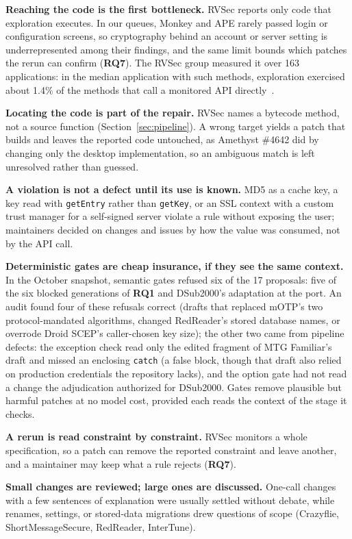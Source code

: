 \documentclass[conference]{IEEEtran}
\newcommand{\researchq}[1]{\textbf{RQ#1}}
\begin{document}
\textbf{Reaching the code is the first bottleneck.} RVSec reports only code
that exploration executes. In our queues, Monkey and APE rarely passed login or
configuration screens, so cryptography behind an account or server setting is
underrepresented among their findings, and the same limit bounds which patches
the rerun can confirm (\researchq{7}). The RVSec group measured it over 163
applications: in the median application with such methods, exploration
exercised about 1.4\% of the methods that call a monitored API
directly~\cite{costa2026effectiveness}.

\textbf{Locating the code is part of the repair.} RVSec names a bytecode
method, not a source function (Section~\ref{sec:pipeline}). A wrong target
yields a patch that builds and leaves the reported code untouched, as Amethyst
\#4642 did by changing only the desktop implementation, so an ambiguous match
is left unresolved rather than guessed.

\textbf{A violation is not a defect until its use is known.} MD5 as a cache
key, a key read with \texttt{getEntry} rather than \texttt{getKey}, or an SSL
context with a custom trust manager for a self-signed server violate a rule
without exposing the user; maintainers decided on changes and issues by how the value was
consumed, not by the API call.

\textbf{Deterministic gates are cheap insurance, if they see the same context.}
In the October snapshot, semantic gates refused six of the 17 proposals: five
of the six blocked generations of \researchq{1} and DSub2000's adaptation at the
port. An audit found four of these refusals correct (drafts that replaced mOTP's two
protocol-mandated algorithms, changed RedReader's stored database names, or
overrode Droid SCEP's caller-chosen key size); the other two came from pipeline
defects: the exception check read only the edited fragment
of MTG Familiar's draft and missed an enclosing \texttt{catch} (a false block,
though that draft also relied on production credentials the repository lacks),
and the option gate had not read a change the adjudication authorized for
DSub2000. Gates remove plausible but harmful patches at no model cost, provided
each reads the context of the stage it checks.

\textbf{A rerun is read constraint by constraint.} RVSec monitors a whole
specification, so a patch can remove the reported constraint and leave
another, and a maintainer may keep what a rule rejects (\researchq{7}).

\textbf{Small changes are reviewed; large ones are discussed.} One-call
changes with a few sentences of explanation were usually settled without
debate, while renames, settings, or stored-data migrations drew questions of
scope (Crazyflie, ShortMessageSecure, RedReader, InterTune).
\end{document}
